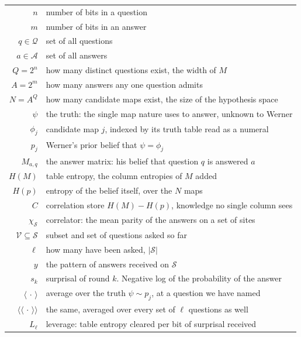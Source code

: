 \documentclass[11pt]{article}
\begin{document}
\begin{table}[H]
\begin{center}
\begin{tabular}{@{}r@{\qquad}l@{}}
\toprule
$n$ & number of bits in a question \\
$m$ & number of bits in an answer \\
$q \in \mathcal{Q}$ & set of all questions \\ 
$a \in \mathcal {A}$ & set of all answers \\
$Q = 2^n$ & how many distinct questions exist, the width of $M$ \\
$A = 2^m$ & how many answers any one question admits \\
$N = A^Q$ & how many candidate maps exist, the size of the hypothesis space \\
\addlinespace[5pt]
$\psi$ & the truth: the single map nature uses to answer, unknown to Werner \\
$\phi_j$ & candidate map $j$, indexed by its truth table read as a numeral \\
$p_j$ & Werner's prior belief that $\psi = \phi_j$ \\
$M_{a,q}$ & the answer matrix: his belief that question $q$ is answered $a$ \\
$H(M)$ & table entropy, the column entropies of $M$ added \\
$H(p)$ & entropy of the belief itself, over the $N$ maps \\
$C$ & correlation store $H(M) - H(p)$, knowledge no single column sees \\
$\chi_{\mathcal S}$ & correlator: the mean parity of the answers on a set of sites \\
\addlinespace[5pt]
$\mathcal V \subseteq \mathcal S$ & subset and set of questions asked so far \\
$\ell$ & how many have been asked, $|\mathcal S|$ \\
$y$ & the pattern of answers received on $\mathcal S$ \\
$s_k$ & surprisal of round $k$. Negative log of the probability of the answer \\
$\langle\,\cdot\,\rangle$ & average over the truth $\psi \sim p_j$, at a question we have named \\
$\langle\!\langle\,\cdot\,\rangle\!\rangle$ & the same, averaged over every set of $\ell$ questions as well \\
$L_\ell$ & leverage: table entropy cleared per bit of surprisal received \\

\end{tabular}
\end{center}
\end{table}
\end{document}
